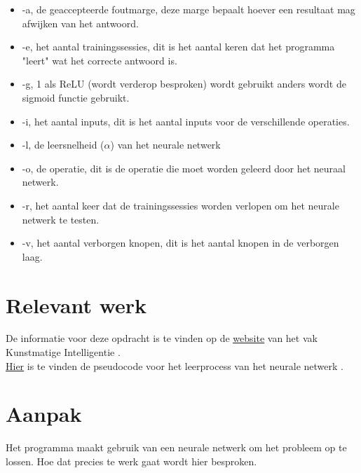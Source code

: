 \documentclass[10pt]{article}
\begin{document}
\begin{itemize}
    \item -a, de geaccepteerde foutmarge, deze marge bepaalt hoever een resultaat mag afwijken van het antwoord.
    \item -e, het aantal trainingssessies, dit is het aantal keren dat het programma "leert" wat het correcte antwoord is.
	\item -g, 1 als ReLU (wordt verderop besproken) wordt gebruikt anders wordt de sigmoid functie gebruikt.
    \item -i, het aantal inputs, dit is het aantal inputs voor de verschillende operaties.
	\item -l, de leersnelheid ($\alpha$) van het neurale netwerk   
	\item -o, de operatie, dit is de operatie die moet worden geleerd door het neuraal netwerk.
    \item -r, het aantal keer dat de trainingssessies worden verlopen om het neurale netwerk te testen.
	\item -v, het aantal verborgen knopen, dit is het aantal knopen in de verborgen laag.
\end{itemize}

\section{Relevant werk}
De informatie voor deze opdracht is te vinden op de \href{http://liacs.leidenuniv.nl/~kosterswa/AI/nn18.html}{\underline{website}} van het vak Kunstmatige Intelligentie \cite{assignment}. \\ \href{http://liacs.leidenuniv.nl/~kosterswa/AI/nnhelp.html}{\underline{Hier}} is te vinden de pseudocode voor het leerprocess van het neurale netwerk \cite{backprop}.

\section{Aanpak}
Het programma maakt gebruik van een neurale netwerk om het probleem op te lossen. Hoe dat precies te werk gaat wordt hier besproken.
\end{document}
